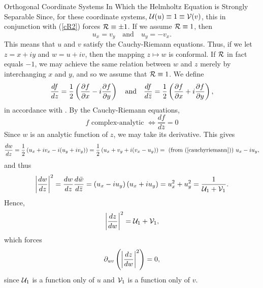 \begin{section}{Orthogonal Coordinate Systems In Which the Helmholtz Equation is Strongly Separable}
Since, for these coordinate systems, $\mathcal{U}(u) \equiv 1 \equiv \mathcal{V}(v)$, this in conjunction with (\ref{cR2}) forces $\mathcal{R} \equiv \pm 1$.  If we assume $\mathcal{R} \equiv 1$, then
\begin{equation}
\label{cauchyriemann}
u_x = v_y
\quad \mbox{and} \quad
u_y = -v_x.
\end{equation}
This means that $u$ and $v$ satisfy the Cauchy-Riemann equations.  Thus, if we let $z = x + iy$ and $w = u + iv$, then the mapping $z \mapsto w$ is conformal.  If $\mathcal{R}$ in fact equals $-1$, we may achieve the same relation between $w$ and $z$ merely by interchanging $x$ and $y$, and so we assume that $\mathcal{R} \equiv 1$.  We define
\begin{equation}
\label{wedefine}
\frac{d f}{d z} = \frac{1}{2} \left( \frac{\partial f}{\partial x} - i \frac{\partial f}{\partial y} \right)
\quad \mbox{and} \quad
\frac{d f}{d \bar{z}} = \frac{1}{2} \left( \frac{\partial f}{\partial x} + i \frac{\partial f}{\partial y} \right),
\end{equation}
in accordance with \cite[pp.~12-17]{greene}.  By the Cauchy-Riemann equations,
\begin{equation}
\label{dzbare0}
f \mbox{ complex-analytic } \iff \frac{d f}{d \bar{z}} = 0
\end{equation}
Since $w$ is an analytic function of $z$, we may take its derivative.  This gives
\[
\frac{d w}{d z} = \frac{1}{2} \left( u_x + i v_x - i(u_y + i v_y) \right) = \frac{1}{2} \left( u_x + v_y + i(v_x - u_y) \right) =
\mbox{ (from (\ref{cauchyriemann})) }
u_x - i u_y,
\]
and thus
\begin{equation}
\label{dwdz}
\left|\frac{d w}{d z}\right|^2 = \frac{d w}{d z} \frac{d \bar{w}}{d \bar{z}} = \left( u_x - iu_y \right) \left( u_x + iu_y \right) = u_x^2 + u_y^2 = \frac{1}{\mathcal{U}_1 + \mathcal{V}_1}.
\end{equation}
Hence,
\begin{equation}
\label{dzdw}
\left|\frac{d z}{d w}\right|^2 = \mathcal{U}_1 + \mathcal{V}_1,
\end{equation}
which forces
\begin{equation}
\label{puv=0}
\partial_{u v} \left( \left|\frac{d z}{d w}\right|^2 \right) = 0,
\end{equation}
since $\mathcal{U}_1$ is a function only of $u$ and $\mathcal{V}_1$ is a function only of $v$.


\end{section}
